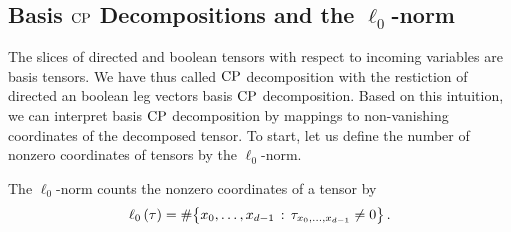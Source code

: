 



\subsection{Basis $\mathrm{CP}$ Decompositions and the $\ell_0$-norm}\label{sec:basisCP}



The slices of directed and boolean tensors with respect to incoming variables are basis tensors.
We have thus called $\mathrm{CP}$ decomposition with the restiction of directed an boolean leg vectors basis $\mathrm{CP}$ decomposition.
Based on this intuition, we can interpret basis $\mathrm{CP}$ decomposition by mappings to non-vanishing coordinates of the decomposed tensor.
To start, let us define the number of nonzero coordinates of tensors by the $\ell_0$-norm.

\begin{definition}
    The $\ell_0$-norm counts the nonzero coordinates of a tensor by
    \begin{align*}
        \ell_0\left(\tau\right) = \#\big\{ x_{0},\ldots,x_{d-1} \,:\, \tau_{x_{0},\ldots,x_{d-1} }\neq 0 \big\} \, .
    \end{align*}
\end{definition}

